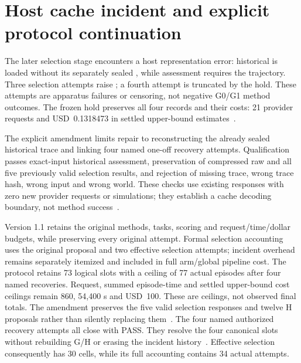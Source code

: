 \section{Host cache incident and explicit protocol continuation}
The later selection stage encounters a host representation error: historical
 is loaded without its separately sealed
, while assessment requires the trajectory. Three selection
attempts raise ; a fourth attempt is truncated by the
hold. These attempts are apparatus failures or censoring, not negative G0/G1
method outcomes. The frozen hold preserves all four records and their costs:
21 provider requests and USD~0.1318473 in settled
upper-bound estimates~\cite{hold}.

The explicit amendment limits repair to reconstructing the already sealed
historical trace and linking four named one-off recovery attempts. Qualification
passes exact-input historical assessment, preservation of compressed raw and
all five previously valid selection results, and rejection of missing trace,
wrong trace hash, wrong input and wrong world. These checks use existing
responses with zero new provider requests or simulations; they establish a
cache decoding boundary, not method success~\cite{qualification}.

Version 1.1 retains the original methods, tasks, scoring and request/time/dollar
budgets, while
preserving every original attempt. Formal selection accounting uses the original
proposal and two effective selection attempts; incident overhead remains
separately itemized and included in full arm/global pipeline cost. The protocol
retains 73 logical slots with a ceiling of 77 actual episodes after four named
recoveries. Request, summed episode-time and settled upper-bound cost ceilings
remain 860, 54,400 s and USD~100. These are ceilings, not observed final totals.
The amendment preserves the five valid selection responses and twelve H
proposals rather than silently replacing them~\cite{amendment,protocol}.
The four named authorized recovery attempts all close with PASS. They resolve
the four canonical slots without rebuilding G/H or erasing the incident
history~\cite{recovery}. Effective selection consequently has 30 cells, while
its full accounting contains 34 actual attempts.

